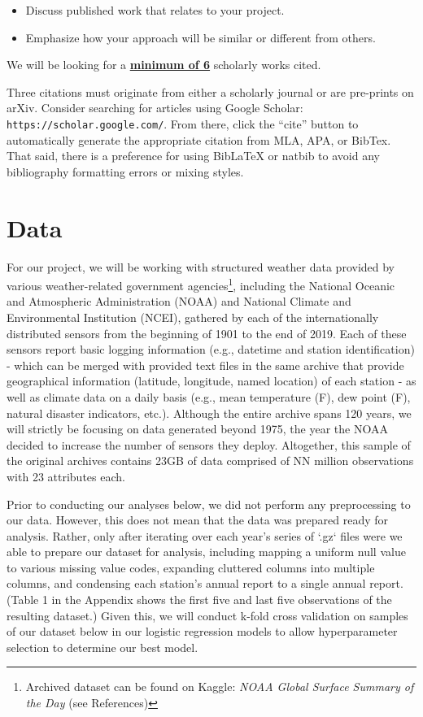 \documentclass[conference]{IEEEtran}
\begin{document}
\begin{itemize}
  \item Discuss published work that relates to your project.
  \item Emphasize how your approach will be similar or different from others.
\end{itemize}

We will be looking for a \textbf{\underline{minimum of 6}} scholarly works cited.

Three citations must originate from either a scholarly journal or are pre-prints on arXiv. Consider searching for articles using Google Scholar: \texttt{https://scholar.google.com/}. From there, click the “cite” button to automatically generate the appropriate citation from MLA, APA, or BibTex. That said, there is a preference for using BibLaTeX or natbib to avoid any bibliography formatting errors or mixing styles.

\section{Data}

For our project, we will be working with structured weather data provided by various weather-related government agencies\footnote{Archived dataset can be found on Kaggle: \textit{NOAA Global Surface Summary of the Day} (see References)}, including the National Oceanic and Atmospheric Administration (NOAA) and National Climate and Environmental Institution (NCEI), gathered by each of the internationally distributed sensors from the beginning of 1901 to the end of 2019. Each of these sensors report basic logging information (e.g., datetime and station identification) - which can be merged with provided text files in the same archive that provide geographical information (latitude, longitude, named location) of each station - as well as climate data on a daily basis (e.g., mean temperature (F), dew point (F), natural disaster indicators, etc.). Although the entire archive spans 120 years, we will strictly be focusing on data generated beyond 1975, the year the NOAA decided to increase the number of sensors they deploy. Altogether, this sample of the original archives contains 23GB of data comprised of NN million observations with 23 attributes each.

Prior to conducting our analyses below, we did not perform any preprocessing to our data. However, this does not mean that the data was prepared ready for analysis. Rather, only after iterating over each year's series of `.gz` files were we able to prepare our dataset for analysis, including mapping a uniform null value to various missing value codes, expanding cluttered columns into multiple columns, and condensing each station's annual report to a single annual report. (Table 1 in the Appendix shows the first five and last five observations of the resulting dataset.) Given this, we will conduct k-fold cross validation on samples of our dataset below in our logistic regression models to allow hyperparameter selection to determine our best model.
\end{document}
